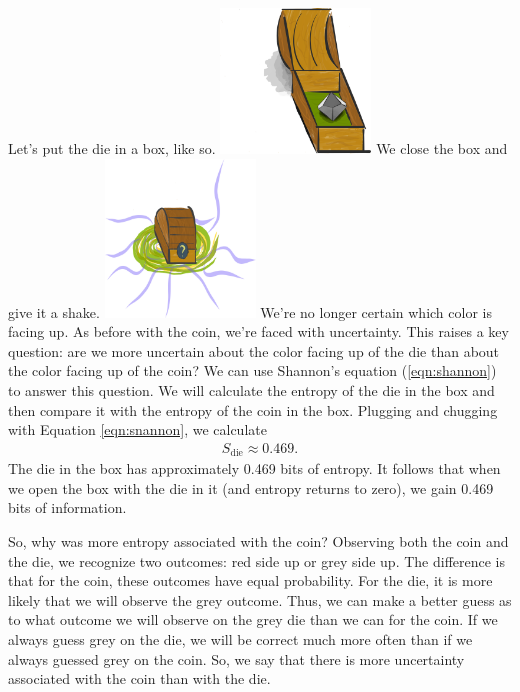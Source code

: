 Let's put the die in a box, like so.
\includegraphics[width=0.3\textwidth]{img/small-box-open-die}
We close the box and give it a shake.
\includegraphics[width=0.3\textwidth]{img/small-box-closed-portal}
We're no longer certain which color is facing up.
As before with the coin, we're faced with uncertainty.
This raises a key question: are we more uncertain about the color facing up of the die than about the color facing up of the coin?
We can use Shannon's equation (\ref{eqn:shannon}) to answer this question.
We will calculate the entropy of the die in the box and then compare it with the entropy of the coin in the box.
Plugging and chugging with Equation \ref{eqn:snannon}, we calculate
\begin{align*}
S_{\text{die}} \approx 0.469.
\end{align*}
The die in the box has approximately 0.469 bits of entropy.
It follows that when we open the box with the die in it (and entropy returns to zero), we gain 0.469 bits of information.

So, why was more entropy associated with the coin?
Observing both the coin and the die, we recognize two outcomes: red side up or grey side up.
The difference is that for the coin, these outcomes have equal probability.
For the die, it is more likely that we will observe the grey outcome.
Thus, we can make a better guess as to what outcome we will observe on the grey die than we can for the coin.
If we always guess grey on the die, we will be correct much more often than if we always guessed grey on the coin.
So, we say that there is more uncertainty associated with the coin than with the die.
